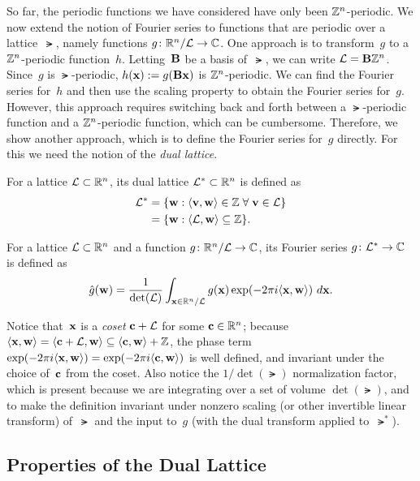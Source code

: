 \documentclass[11pt]{article}
\begin{document}
So far, the periodic functions we have considered have only been
$\mathbb{Z}^n$-periodic. We now extend the notion of Fourier series to
functions that are periodic over a lattice~$\lat$, namely functions
$g \colon \mathbb{R}^n/ \mathcal{L} \to \mathbb{C}$. One approach is to transform~$g$ to a
$\mathbb{Z}^n$-periodic function~$h$. Letting~$\mathbf{B}$ be a basis of~$\lat$, we
can write $\mathcal{L} = \mathbf{B} \mathbb{Z}^n$. Since~$g$ is $\lat$-periodic,
$h(\mathbf{x}) := g(\mathbf{B} \mathbf{x})$ is $\mathbb{Z}^n$-periodic. We can find the
Fourier series for~$h$ and then use the scaling property to obtain the
Fourier series for~$g$. However, this approach requires switching back
and forth between a $\lat$-periodic function and a $\mathbb{Z}^n$-periodic
function, which can be cumbersome. Therefore, we show another
approach, which is to define the Fourier series for~$g$ directly. For
this we need the notion of the \emph{dual lattice}.

\begin{definition}
  \label{def:dual-lattice}
  For a lattice $\mathcal{L} \subset \mathbb{R}^{n}$, its dual lattice $\mathcal{L}^{*}
  \subset \mathbb{R}^{n}$ is defined as
  \begin{align*}
    \mathcal{L}^{*}
    &= \{ \mathbf{w} : \langle\mathbf{v},\mathbf{w}\rangle \in \mathbb{Z} \; \forall\;
      \mathbf{v} \in \mathcal{L}\} \\
    &= \{ \mathbf{w} : \langle\mathcal{L},\mathbf{w}\rangle \subseteq \mathbb{Z}\} .
  \end{align*}
\end{definition}

\begin{definition}
  For a lattice $\mathcal{L} \subset \mathbb{R}^{n}$ and a function
  $g \colon \mathbb{R}^n/\mathcal{L} \to \mathbb{C}$, its Fourier series $g \colon \mathcal{L}^{*}
  \to \mathbb{C}$ is defined as
  \[ \hat{g}(\mathbf{w}) = \frac{1}{\det(\mathcal{L})} \int_{\mathbf{x} \in \mathbb{R}^n /
      \mathcal{L}} g(\mathbf{x}) \exp(-2 \pi i \langle\mathbf{x},\mathbf{w}\rangle )\ d\mathbf{x} .\]
\end{definition}
Notice that~$\mathbf{x}$ is a \emph{coset} $\mathbf{c}+\mathcal{L}$ for some
$\mathbf{c} \in \mathbb{R}^{n}$; because
$\langle\mathbf{x},\mathbf{w}\rangle = \langle\mathbf{c}+\mathcal{L},\mathbf{w}\rangle \subseteq
\langle\mathbf{c},\mathbf{w}\rangle + \mathbb{Z}$, the phase term
$\exp(-2 \pi i \langle\mathbf{x},\mathbf{w}\rangle) = \exp(-2 \pi i \langle\mathbf{c},
  \mathbf{w}\rangle)$ is well defined, and invariant under the choice of~$\mathbf{c}$
from the coset. Also notice the $1/\det(\lat)$ normalization factor,
which is present because we are integrating over a set of volume
$\det(\lat)$, and to make the definition invariant under nonzero
scaling (or other invertible linear transform) of~$\lat$ and the input
to~$g$ (with the dual transform applied to~$\lat^{*}$).

\subsection{Properties of the Dual Lattice}
\end{document}
